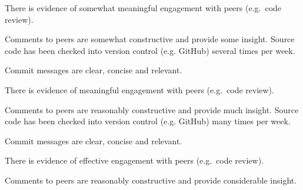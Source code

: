 \documentclass{../../fal_assignment}
\begin{document}
\begin{markingrubric}
            \par There is evidence of somewhat meaningful engagement with peers (e.g.\ code review).
            \par Comments to peers are somewhat constructive and provide some insight.
        \grade Source code has been checked into version control (e.g. GitHub) several times per week.
            \par Commit messages are clear, concise and relevant.
            \par There is evidence of meaningful engagement with peers (e.g.\ code review).
            \par Comments to peers are reasonably constructive and provide much insight.
        \grade Source code has been checked into version control (e.g. GitHub) many times per week.
            \par Commit messages are clear, concise and relevant.
            \par There is evidence of effective engagement with peers (e.g.\ code review).
            \par Comments to peers are reasonably constructive and provide considerable insight.
%
\end{markingrubric}
\end{document}
